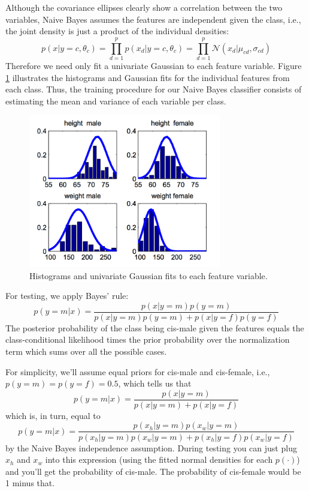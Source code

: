 \documentclass[a4paper]{article}
\begin{document}
Although the covariance ellipses clearly show a correlation between the two variables, Naive Bayes assumes the features are independent given the class, i.e., the joint density is just a product of the individual densities:
$$
p(x|y=c,\theta_c) = \prod_{d=1}^{p} p(x_d|y=c,\theta_c) = \prod_{d=1}^{p}\mathcal{N}(x_d|\mu_{cd}, \sigma_{cd})
$$
Therefore we need only fit a univariate Gaussian to each feature variable.  
Figure \ref{fig:univariate_dist} illustrates the histograms and Gaussian fits for the individual features from each class.  Thus, the training procedure for our Naive Bayes classifier consists of estimating the mean and variance of each variable per class.


\begin{figure}
\centering
\includegraphics[width=0.75\textwidth]{fig2_murphy.png}
\caption{\label{fig:univariate_dist}Histograms and univariate Gaussian fits to each feature variable.}
\end{figure}

For testing, we apply Bayes' rule:
$$
p(y=m|x) = \frac{p(x|y=m)p(y=m)}{p(x|y=m)p(y=m) + p(x|y=f)p(y=f)}
$$
The posterior probability of the class being cis-male given the features equals the class-conditional likelihood times the prior probability over the normalization term which sums over all the possible cases.

For simplicity, we'll assume equal priors for cis-male and cis-female, i.e., $p(y=m)=p(y=f)=0.5$, which tells us that
$$
p(y=m|x) = \frac{p(x|y=m)}{p(x|y=m) + p(x|y=f)}
$$
which is, in turn, equal to
$$
p(y=m|x) = \frac{p(x_h|y=m)p(x_w|y=m)}{p(x_h|y=m)p(x_w|y=m) + p(x_h|y=f)p(x_w|y=f)}
$$
by the Naive Bayes independence assumption.
During testing you can just plug $x_h$ and $x_w$ into this expression (using the fitted normal densities for each $p(\cdot)$) and you'll get the probability of cis-male.  The probability of cis-female would be 1 minus that.
\end{document}
